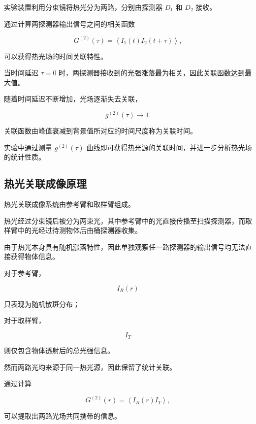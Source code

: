 \documentclass[a4paper]{ctexart}
\begin{document}
实验装置利用分束镜将热光分为两路，分别由探测器
$D_1$
和
$D_2$
接收。

通过计算两探测器输出信号之间的相关函数

\begin{equation}
G^{(2)}(\tau)
=
\left<
I_1(t)
I_2(t+\tau)
\right>,
\end{equation}

可以获得热光场的时间关联特性。

当时间延迟
$\tau=0$
时，两探测器接收到的光强涨落最为相关，因此关联函数达到最大值。

随着时间延迟不断增加，光场逐渐失去关联，

\begin{equation}
g^{(2)}(\tau)
\rightarrow
1.
\end{equation}

关联函数由峰值衰减到背景值所对应的时间尺度称为关联时间。

实验中通过测量
$g^{(2)}(\tau)$
曲线即可获得热光源的关联时间，并进一步分析热光场的统计性质。

\subsection{热光关联成像原理}

热光关联成像系统由参考臂和取样臂组成。

热光经过分束镜后被分为两束光，其中参考臂中的光直接传播至扫描探测器，而取样臂中的光经过待测物体后由桶探测器收集。

由于热光本身具有随机涨落特性，因此单独观察任一路探测器的输出信号均无法直接获得物体信息。

对于参考臂，

\begin{equation}
I_R(r)
\end{equation}

只表现为随机散斑分布；

对于取样臂，

\begin{equation}
I_T
\end{equation}

则仅包含物体透射后的总光强信息。

然而两路光均来源于同一热光源，因此保留了统计关联。

通过计算

\begin{equation}
G^{(2)}(r)
=
\left<
I_R(r)I_T
\right>,
\end{equation}

可以提取出两路光场共同携带的信息。
\end{document}
